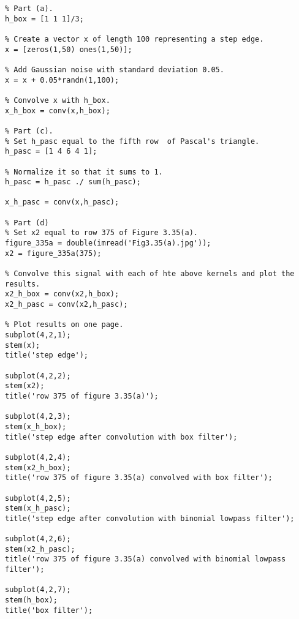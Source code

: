 \documentclass[9pt]{article}
\begin{document}
\begin{enumerate}
\begin{verbatim}
% Part (a).
h_box = [1 1 1]/3;

% Create a vector x of length 100 representing a step edge.
x = [zeros(1,50) ones(1,50)];

% Add Gaussian noise with standard deviation 0.05.
x = x + 0.05*randn(1,100);

% Convolve x with h_box.
x_h_box = conv(x,h_box);

% Part (c).
% Set h_pasc equal to the fifth row  of Pascal's triangle.
h_pasc = [1 4 6 4 1];

% Normalize it so that it sums to 1.
h_pasc = h_pasc ./ sum(h_pasc);

x_h_pasc = conv(x,h_pasc);

% Part (d)
% Set x2 equal to row 375 of Figure 3.35(a).
figure_335a = double(imread('Fig3.35(a).jpg'));
x2 = figure_335a(375);

% Convolve this signal with each of hte above kernels and plot the results.
x2_h_box = conv(x2,h_box);
x2_h_pasc = conv(x2,h_pasc);

% Plot results on one page.
subplot(4,2,1);
stem(x);
title('step edge');

subplot(4,2,2);
stem(x2);
title('row 375 of figure 3.35(a)');

subplot(4,2,3);
stem(x_h_box);
title('step edge after convolution with box filter');

subplot(4,2,4);
stem(x2_h_box);
title('row 375 of figure 3.35(a) convolved with box filter');

subplot(4,2,5);
stem(x_h_pasc);
title('step edge after convolution with binomial lowpass filter');

subplot(4,2,6);
stem(x2_h_pasc);
title('row 375 of figure 3.35(a) convolved with binomial lowpass filter');

subplot(4,2,7);
stem(h_box);
title('box filter');


\end{verbatim}
\end{enumerate}
\end{document}
